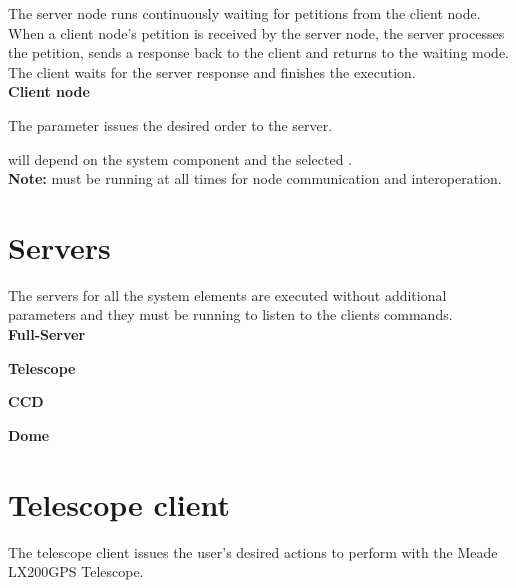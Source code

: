 \documentclass[a4paper,english]{article}
\begin{document}
The server node runs continuously waiting for petitions from the client node. When a client node's petition is received by the server node, the server processes the petition, sends a response back to the client and returns to the waiting mode. The client waits for the server response and finishes the execution. \\

\noindent
\textbf{Client node}

The  parameter issues the desired order to the server.

 will depend on the system component and the selected . \\

\noindent
\textbf{Note:}  must be running at all times for node communication and interoperation.


\section{Servers}

The servers for all the system elements are executed without additional parameters and they must be running to listen to the clients commands. \\

\noindent
\textbf{Full-Server}

  

\noindent
\textbf{Telescope}

  

\noindent
\textbf{CCD}

  

\noindent
\textbf{Dome}

  


\section{Telescope client}

The telescope client issues the user's desired actions to perform with the Meade LX200GPS Telescope. \\

     

     
\end{document}
